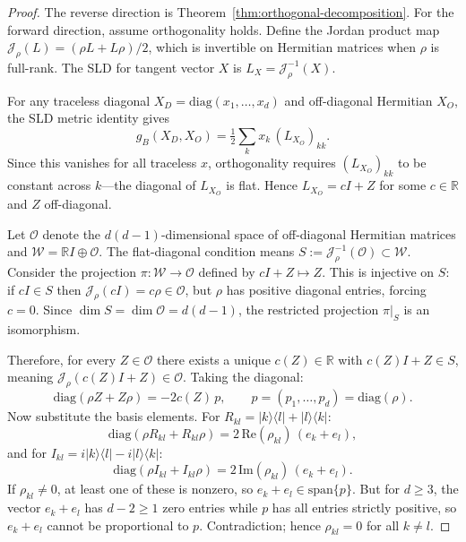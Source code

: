 \documentclass[12pt,a4paper]{article}
\theoremstyle{definition}
\theoremstyle{remark}
\begin{document}
\begin{proof}
The reverse direction is Theorem~\ref{thm:orthogonal-decomposition}. For the forward direction, assume orthogonality holds. Define the Jordan product map $\mathcal{J}_\rho(L) = (\rho L + L\rho)/2$, which is invertible on Hermitian matrices when $\rho$ is full-rank. The SLD for tangent vector $X$ is $L_X = \mathcal{J}_\rho^{-1}(X)$.

For any traceless diagonal $X_D = \mathrm{diag}(x_1, \ldots, x_d)$ and off-diagonal Hermitian $X_O$, the SLD metric identity gives
\begin{equation}
\label{eq:sld-identity}
g_B(X_D, X_O) = \tfrac{1}{2}\sum_k x_k\, (L_{X_O})_{kk}.
\end{equation}
Since this vanishes for all traceless $x$, orthogonality requires $(L_{X_O})_{kk}$ to be constant across $k$---the diagonal of $L_{X_O}$ is flat. Hence $L_{X_O} = c I + Z$ for some $c \in \mathbb{R}$ and $Z$ off-diagonal.

Let $\mathcal{O}$ denote the $d(d{-}1)$-dimensional space of off-diagonal Hermitian matrices and $\mathcal{W} = \mathbb{R}I \oplus \mathcal{O}$. The flat-diagonal condition means $S := \mathcal{J}_\rho^{-1}(\mathcal{O}) \subset \mathcal{W}$. Consider the projection $\pi\colon \mathcal{W} \to \mathcal{O}$ defined by $cI + Z \mapsto Z$. This is injective on $S$: if $cI \in S$ then $\mathcal{J}_\rho(cI) = c\rho \in \mathcal{O}$, but $\rho$ has positive diagonal entries, forcing $c = 0$. Since $\dim S = \dim \mathcal{O} = d(d{-}1)$, the restricted projection $\pi|_S$ is an isomorphism.

Therefore, for every $Z \in \mathcal{O}$ there exists a unique $c(Z) \in \mathbb{R}$ with $c(Z)I + Z \in S$, meaning $\mathcal{J}_\rho(c(Z)I + Z) \in \mathcal{O}$. Taking the diagonal:
\begin{equation}
\label{eq:diag-constraint}
\mathrm{diag}(\rho Z + Z\rho) = -2c(Z)\, p, \qquad p = (p_1, \ldots, p_d) = \mathrm{diag}(\rho).
\end{equation}
Now substitute the basis elements. For $R_{kl} = |k\rangle\langle l| + |l\rangle\langle k|$:
\begin{equation}
\label{eq:diag-Rkl}
\mathrm{diag}(\rho R_{kl} + R_{kl}\rho) = 2\,\mathrm{Re}(\rho_{kl})\,(e_k + e_l),
\end{equation}
and for $I_{kl} = i|k\rangle\langle l| - i|l\rangle\langle k|$:
\begin{equation}
\label{eq:diag-Ikl}
\mathrm{diag}(\rho I_{kl} + I_{kl}\rho) = 2\,\mathrm{Im}(\rho_{kl})\,(e_k + e_l).
\end{equation}
If $\rho_{kl} \neq 0$, at least one of these is nonzero, so $e_k + e_l \in \mathrm{span}\{p\}$. But for $d \geq 3$, the vector $e_k + e_l$ has $d - 2 \geq 1$ zero entries while $p$ has all entries strictly positive, so $e_k + e_l$ cannot be proportional to $p$. Contradiction; hence $\rho_{kl} = 0$ for all $k \neq l$.
\end{proof}
\end{document}
